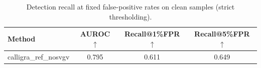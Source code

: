 \begin{table}[t]
\centering
\small
\begin{tabular}{lccc}
\toprule
Method & AUROC$\uparrow$ & Recall@1\%FPR$\uparrow$ & Recall@5\%FPR$\uparrow$ \\
\midrule
calligra\_ref\_nosvgv & 0.795 & 0.611 & 0.649 \\
\bottomrule
\end{tabular}
\caption{Detection recall at fixed false-positive rates on clean samples (strict thresholding).}
\label{tab:detection_fpr_single}
\end{table}
